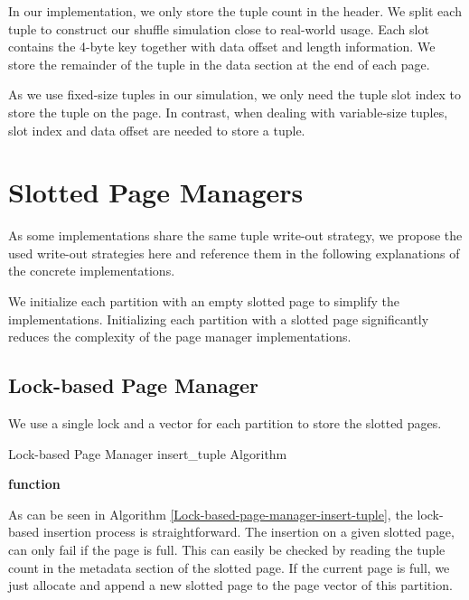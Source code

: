 In our implementation, we only store the tuple count in the header.
We split each tuple to construct our shuffle simulation close to real-world usage.
Each slot contains the 4-byte key together with data offset and length information.
We store the remainder of the tuple in the data section at the end of each page.

As we use fixed-size tuples in our simulation, we only need the tuple slot index to store the tuple on the page.
In contrast, when dealing with variable-size tuples, slot index and data offset are needed to store a tuple.

\section{Slotted Page Managers}\label{section-slotted-page-managers}
As some implementations share the same tuple write-out strategy, we propose the used write-out strategies here and reference them in the following explanations of the concrete implementations.

We initialize each partition with an empty slotted page to simplify the implementations.
Initializing each partition with a slotted page significantly reduces the complexity of the page manager implementations.

\subsection{Lock-based Page Manager}
We use a single lock and a vector for each partition to store the slotted pages.
\begin{algorithm}[h]
  \caption{Lock-based Page Manager insert\_tuple Algorithm}\label{Lock-based-page-manager-insert-tuple}


  \textbf{function} \end{algorithm} As can be seen in Algorithm \ref{Lock-based-page-manager-insert-tuple}, the lock-based insertion process is straightforward.
The insertion on a given slotted page, can only fail if the page is full.
This can easily be checked by reading the tuple count in the metadata section of the slotted page.
If the current page is full, we just allocate and append a new slotted page to the page vector of this partition.

